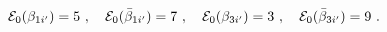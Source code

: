 \begin{equation}\label{eng3}
{\cal E}_0 (\beta_{1i'}) = 5 ~,~~~
{\cal E}_0 (\bar\beta_{1i'}) = 7 ~,~~~
{\cal E}_0 (\beta_{3i'}) = 3 ~,~~~
{\cal E}_0 (\bar\beta_{3i'}) = 9 ~.
\end{equation}

